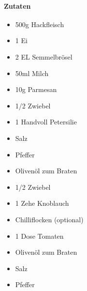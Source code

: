\newpage
{}

\paragraph{Zutaten}
\begin{itemize}[noitemsep]
	\item 500g Hackfleisch
	\item 1 Ei
	\item 2 EL Semmelbrösel
	\item 50ml Milch
	\item 10g Parmesan
	\item 1/2 Zwiebel
	\item 1 Handvoll Petersilie
	\item Salz
	\item Pfeffer
	\item Olivenöl zum Braten
	\vspace{0.5cm}
	\item 1/2 Zwiebel
	\item 1 Zehe Knoblauch
	\item Chilliflocken (optional)
	\item 1 Dose Tomaten
	\item Olivenöl zum Braten
	\item Salz
	\item Pfeffer
\end{itemize}

